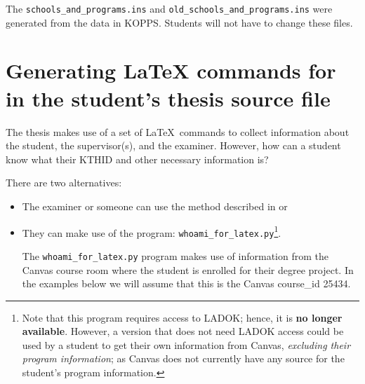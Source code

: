 The \texttt{schools\_and\_programs.ins} and \texttt{old\_schools\_and\_programs.ins} were generated from the data in KOPPS. Students will not have to change these files.
\clearpage


\section{Generating LaTeX commands for in the student’s thesis source file}
The thesis makes use of a set of \LaTeX~commands to collect information about the student, the supervisor(s), and the examiner. However, how can a student know what their KTHID and other necessary information is?

There are two alternatives:
\begin{itemize}
    \item The examiner or someone can use the method described in  or

    \item They can make use of the program: \texttt{whoami\_for\_latex.py}\footnote{Note that this program requires access to LADOK; hence, it is \textbf{no longer available}. However, a version that does not need LADOK access could be used by a student to get their own information from Canvas, \textit{excluding their program information}; as Canvas does not currently have any source for the student's program information.}.
    
    The \texttt{whoami\_for\_latex.py} program makes use of information from the Canvas course room where the student is enrolled for their degree project. In the examples below we will assume that this is the Canvas course\_id 25434.
\end{itemize}

